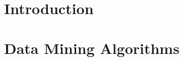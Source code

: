 \documentclass[a4paper,10pt]{book}
\begin{document}
\newcommand\litem[1]{\item{\bfseries #1}}

\chapter{Introduction}


\chapter{Data Mining Algorithms}


 

\cite{}
\end{document}
